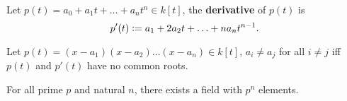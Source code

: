 \documentclass[../Year2.tex]{subfiles}
\begin{document}
\vspace{-30pt}

\begin{definition}[Derivative]
    Let $p(t)= a_0 + a_1t + \ldots + a_nt^n\in k[t]$, the \textbf{derivative} of $p(t)$ is \[
        p'(t):= a_1 + 2a_2t + \ldots + na_nt^{n-1}
        \text{\textcolor{black}{.}}
    \]
\end{definition}

\begin{lemma}
    Let $p(t)=(x-a_1)(x-a_2)\ldots(x-a_n)\in k[t]$, $a_i\neq a_j$ for all $i\neq j$ iff $p(t)$ and $p'(t)$ have no common roots.
\end{lemma}

\begin{theorem}
    For all prime $p$ and natural $n$, there exists a field with $p^n$ elements.
\end{theorem}
\end{document}
